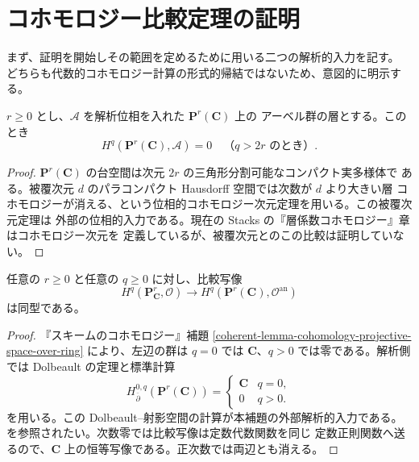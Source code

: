 
\section{コホモロジー比較定理の証明}
\label{section-proof-gaga-cohomology}

まず、証明を開始しその範囲を定めるために用いる二つの解析的入力を記す。
どちらも代数的コホモロジー計算の形式的帰結ではないため、意図的に明示する。

\begin{lemma}[射影空間の解析的コホモロジー次元]
\label{lemma-projective-analytic-cohomological-dimension}
$r \geq 0$ とし、$\mathcal A$ を解析位相を入れた $\mathbf P^r(\mathbf C)$ 上の
アーベル群の層とする。このとき
$$
H^q(\mathbf P^r(\mathbf C),\mathcal A)=0
\quad\text{（}q>2r\text{ のとき）}.
$$
\end{lemma}

\begin{proof}
$\mathbf P^r(\mathbf C)$ の台空間は次元 $2r$ の三角形分割可能なコンパクト実多様体で
ある。被覆次元 $d$ のパラコンパクト Hausdorff 空間では次数が $d$ より大きい層
コホモロジーが消える、という位相的コホモロジー次元定理を用いる。この被覆次元定理は
外部の位相的入力である。現在の Stacks の『層係数コホモロジー』章はコホモロジー次元を
定義しているが、被覆次元とのこの比較は証明していない。
\end{proof}

\begin{lemma}
\label{lemma-projective-structure-sheaf-comparison}
任意の $r \geq 0$ と任意の $q \geq 0$ に対し、比較写像
$$
H^q(\mathbf P^r_{\mathbf C},\mathcal O)
\longrightarrow
H^q(\mathbf P^r(\mathbf C),\mathcal O^{\mathrm{an}})
$$
は同型である。
\end{lemma}

\begin{proof}
『スキームのコホモロジー』補題
\ref{coherent-lemma-cohomology-projective-space-over-ring} により、左辺の群は $q=0$ では
$\mathbf C$、$q>0$ では零である。解析側では Dolbeault の定理と標準計算
$$
H^{0,q}_{\overline\partial}(\mathbf P^r(\mathbf C))=
\begin{cases}
\mathbf C & q=0,\\
0 & q>0.
\end{cases}
$$
を用いる。この Dolbeault--射影空間の計算が本補題の外部解析的入力である。
\cite[\S 2、第13項]{GAGA} を参照されたい。次数零では比較写像は定数代数関数を同じ
定数正則関数へ送るので、$\mathbf C$ 上の恒等写像である。正次数では両辺とも消える。
\end{proof}

